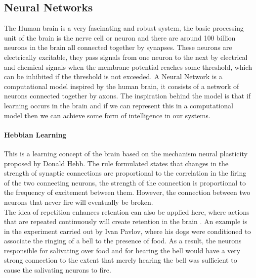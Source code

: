 \documentclass[a4paper,12pt]{report}
\begin{document}
		\subsection{Neural Networks}
				The Human brain is a very fascinating and robust system, the basic processing unit of the brain is the nerve cell or neuron and there are around 100 billion neurons in the brain all connected together by synapses. These neurons are electrically excitable, they pass signals from one neuron to the next by electrical and chemical signals when the membrane potential reaches some threshold, which can be inhibited if the threshold is not exceeded. A Neural Network is a computational model inspired by the human brain, it consists of a network of neurons connected together by axons. The inspiration behind the model is that if learning occurs in the brain and if we can represent this in a computational model then we can achieve some form of intelligence in our systems.
				\paragraph{Hebbian Learning}
				This is a learning concept of the brain based on the mechanism neural plasticity proposed by Donald Hebb. The rule formulated states that changes in the strength of synaptic connections are proportional to the correlation in the firing of the two connecting neurons, the strength of the connection is proportional to the frequency of excitement between them. However, the connection between two neurons that never fire will eventually be broken. \\
				The idea of repetition enhances retention can also be applied here, where actions that are repeated continuously will create retention in the brain \cite{Cunninghametal1984}. An example is in the experiment carried out by Ivan Pavlov, where his dogs were conditioned to associate the ringing of a bell to the presence of food. As a result, the neurons responsible for salivating over food and for hearing the bell would have a very strong connection to the extent that merely hearing the bell was sufficient to cause the salivating neurons to fire. 
\end{document}
